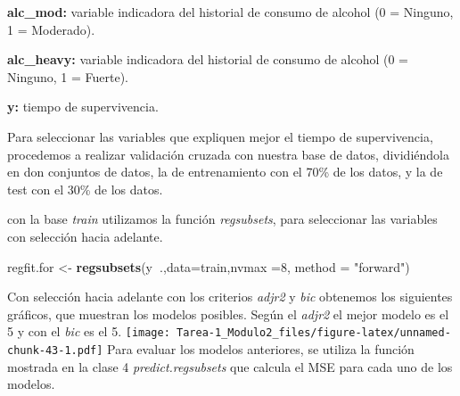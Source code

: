 \documentclass[
]{article}
\newenvironment{Shaded}{\begin{snugshade}}{\end{snugshade}}
\newcommand{\CommentTok}[1]{\textcolor[rgb]{0.56,0.35,0.01}{\textit{#1}}}
\newcommand{\DataTypeTok}[1]{\textcolor[rgb]{0.13,0.29,0.53}{#1}}
\newcommand{\DecValTok}[1]{\textcolor[rgb]{0.00,0.00,0.81}{#1}}
\newcommand{\FloatTok}[1]{\textcolor[rgb]{0.00,0.00,0.81}{#1}}
\newcommand{\KeywordTok}[1]{\textcolor[rgb]{0.13,0.29,0.53}{\textbf{#1}}}
\newcommand{\NormalTok}[1]{#1}
\newcommand{\OperatorTok}[1]{\textcolor[rgb]{0.81,0.36,0.00}{\textbf{#1}}}
\newcommand{\StringTok}[1]{\textcolor[rgb]{0.31,0.60,0.02}{#1}}
\begin{document}
\textbf{alc\_mod:} variable indicadora del historial de consumo de
alcohol (0 = Ninguno, 1 = Moderado).

\textbf{alc\_heavy:} variable indicadora del historial de consumo de
alcohol (0 = Ninguno, 1 = Fuerte).

\textbf{y:} tiempo de supervivencia.

Para seleccionar las variables que expliquen mejor el tiempo de
supervivencia, procedemos a realizar validación cruzada con nuestra base
de datos, dividiéndola en don conjuntos de datos, la de entrenamiento
con el 70\% de los datos, y la de test con el 30\% de los datos.

\begin{Shaded}
\end{Shaded}

con la base \emph{train} utilizamos la función \emph{regsubsets}, para
seleccionar las variables con selección hacia adelante.

\begin{Shaded}
\begin{Highlighting}[]
\NormalTok{regfit.for <-}\StringTok{ }\KeywordTok{regsubsets}\NormalTok{(y}\OperatorTok{~}\NormalTok{.,}\DataTypeTok{data=}\NormalTok{train,}\DataTypeTok{nvmax =}\DecValTok{8}\NormalTok{, }\DataTypeTok{method =} \StringTok{"forward"}\NormalTok{)}
\end{Highlighting}
\end{Shaded}

Con selección hacia adelante con los criterios \emph{adjr2} y \emph{bic}
obtenemos los siguientes gráficos, que muestran los modelos posibles.
Según el \emph{adjr2} el mejor modelo es el 5 y con el \emph{bic} es el
5.
\texttt{[image: Tarea-1\_Modulo2\_files/figure-latex/unnamed-chunk-43-1.pdf]}
Para evaluar los modelos anteriores, se utiliza la función mostrada en
la clase 4 \emph{predict.regsubsets} que calcula el MSE para cada uno de
los modelos.
\end{document}
